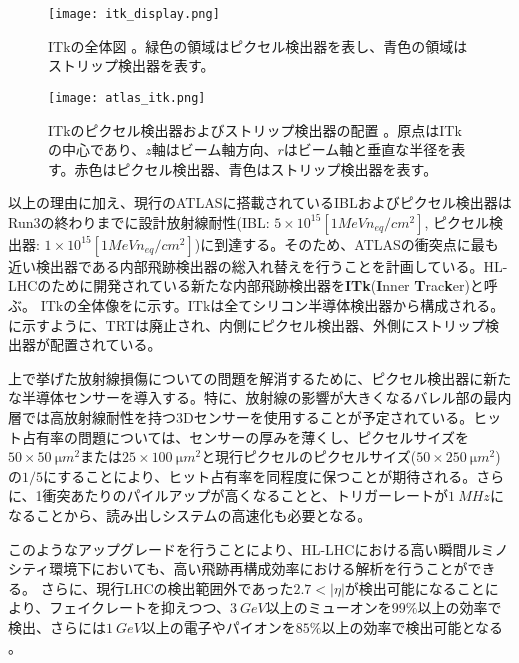 \begin{figure}[tbp]
  \centering
  \texttt{[image: itk\_display.png]}
  \caption[ITkの全体図]{ITkの全体図 \cite{itk}。緑色の領域はピクセル検出器を表し、青色の領域はストリップ検出器を表す。}
  \label{fig:hl-lhc-itk}
\end{figure}

\begin{figure}[tbp]
  \centering
  \texttt{[image: atlas\_itk.png]}
  \caption[ITkのピクセル検出器およびストリップ検出器の配置]{ITkのピクセル検出器およびストリップ検出器の配置 \cite{itkpixellayoutupdate}。原点はITkの中心であり、$z$軸はビーム軸方向、$r$はビーム軸と垂直な半径を表す。赤色はピクセル検出器、青色はストリップ検出器を表す。}
  \label{fig:itk-danmen}
\end{figure}

以上の理由に加え、現行のATLASに搭載されているIBLおよびピクセル検出器はRun3の終わりまでに設計放射線耐性(IBL: $5 \times 10^{15} [\si{1 MeV n_{eq} /cm^2}]$, ピクセル検出器: $1 \times 10^{15} [\si{1 MeV n_{eq} /cm^2}]$)に到達する。そのため、ATLASの衝突点に最も近い検出器である内部飛跡検出器の総入れ替えを行うことを計画している。HL-LHCのために開発されている新たな内部飛跡検出器を\textbf{ITk}(\textbf{I}nner \textbf{T}rac\textbf{k}er)と呼ぶ。
ITkの全体像をに示す。ITkは全てシリコン半導体検出器から構成される。に示すように、TRTは廃止され、内側にピクセル検出器、外側にストリップ検出器が配置されている。

上で挙げた放射線損傷についての問題を解消するために、ピクセル検出器に新たな半導体センサーを導入する。特に、放射線の影響が大きくなるバレル部の最内層では高放射線耐性を持つ3Dセンサーを使用することが予定されている。ヒット占有率の問題については、センサーの厚みを薄くし、ピクセルサイズを$50\times 50\ \si{\micro m^2}$または$25\times 100\ \si{\micro m^2}$と現行ピクセルのピクセルサイズ($50\times250\ \si{\micro m^2}$)の$1/5$にすることにより、ヒット占有率を同程度に保つことが期待される。さらに、1衝突あたりのパイルアップが高くなることと、トリガーレートが$1\ \si{MHz}$になることから、読み出しシステムの高速化も必要となる。


このようなアップグレードを行うことにより、HL-LHCにおける高い瞬間ルミノシティ環境下においても、高い飛跡再構成効率における解析を行うことができる。
さらに、現行LHCの検出範囲外であった$2.7<|\eta|$が検出可能になることにより、フェイクレートを抑えつつ、$3\ \si{GeV}$以上のミューオンを$99\si{\%}$以上の効率で検出、さらには$1\ \si{GeV}$以上の電子やパイオンを$85\si{\%}$以上の効率で検出可能となる \cite{itk}。



